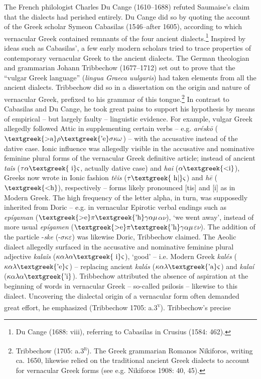 \documentclass[12pt]{article}
\newenvironment{styleStandard}{\renewcommand\baselinestretch{1.25}\setlength\leftskip{0in}\setlength\rightskip{0in}\setlength\parindent{0.1972in}\setlength\parfillskip{0pt plus 1fil}\setlength\parskip{0in plus 1pt}\writerlistparindent\writerlistleftskip\leavevmode\normalfont\normalsize\writerlistlabel\ignorespaces}{\unskip\vspace{0in plus 1pt}\par}
\newcommand\writerlistleftskip{}
\newcommand\writerlistparindent{}
\newcommand\writerlistlabel{}
\begin{document}
\begin{styleStandard}
The French philologist Charles Du Cange (1610–1688) refuted Saumaise’s claim that the dialects had perished entirely. Du Cange did so by quoting the account of the Greek scholar Symeon Cabasilas (1546–after 1605), according to which vernacular Greek contained remnants of the four ancient dialects.\footnote{ Du Cange (1688: viii), referring to Cabasilas in Crusius (1584: 462).} Inspired by ideas such as Cabasilas’, a few early modern scholars tried to trace properties of contemporary vernacular Greek to the ancient dialects. The German theologian and grammarian Johann Tribbechow (1677–1712) set out to prove that the “vulgar Greek language” (\textit{lingua Graeca uulgaris}) had taken elements from all the ancient dialects. Tribbechow did so in a dissertation on the origin and nature of vernacular Greek, prefixed to his grammar of this tongue.\footnote{ Tribbechow (1705: a.3\textsc{\textsuperscript{r}}). The Greek grammarian Romanos Nikiforos, writing ca. 1650, likewise relied on the traditional ancient Greek dialects to account for vernacular Greek forms (see e.g. Nikiforos 1908: 40, 45).} In contrast to Cabasilas and Du Cange, he took great pains to support his hypothesis by means of empirical – but largely faulty – linguistic evidence. For example, vulgar Greek allegedly followed Attic in supplementing certain verbs – e.g. \textit{arésk\=o }($\text{\textgreek{>a}}\rho \text{\textgreek{'e}}\sigma \kappa \omega $) – with the accusative instead of the dative case. Ionic influence was allegedly visible in the accusative and nominative feminine plural forms of the vernacular Greek definitive article; instead of ancient \textit{taîs} ($\tau \alpha \text{\textgreek{~i}}\varsigma $, actually dative case) and \textit{hai} ($\alpha \text{\textgreek{<i}}$), Greeks now wrote in Ionic fashion \textit{têis} ($\tau \text{\textgreek{~h|}}\varsigma $) and \textit{h\=e} ($\text{\textgreek{<h}}$), respectively – forms likely pronounced [tis] and [i] as in Modern Greek. The high frequency of the letter alpha, in turn, was supposedly inherited from Doric – e.g. in vernacular Epirotic verbal endings such as \textit{epígaman }($\text{\textgreek{>e}}\pi \text{\textgreek{'h}}\gamma \alpha \mu $$\alpha $$\nu $), ‘we went away’, instead of more usual \textit{epígamen} ($\text{\textgreek{>e}}\pi \text{\textgreek{'h}}\gamma \alpha \mu $$\varepsilon $$\nu $). The addition of the particle -\textit{ske} (-$\sigma \kappa \varepsilon $) was likewise Doric, Tribbechow claimed. The Aeolic dialect allegedly surfaced in the accusative and nominative feminine plural adjective \textit{kalaîs} ($\kappa \alpha \lambda \alpha \text{\textgreek{~i}}\varsigma $), ‘good’ – i.e. Modern Greek \textit{kalés }($\kappa \alpha \lambda \text{\textgreek{'e}}\varsigma $) – replacing ancient \textit{kalás} ($\kappa \alpha \lambda \text{\textgreek{'a}}\varsigma $) and \textit{kalaí} ($\kappa \alpha \lambda \alpha \text{\textgreek{'i}}$). Tribbechow attributed the absence of aspiration at the beginning of words in vernacular Greek – so-called psilosis – likewise to this dialect. Uncovering the dialectal origin of a vernacular form often demanded great effort, he emphasized (Tribbechow 1705: a.3\textsc{\textsuperscript{v}}). Tribbechow’s precise 
\end{styleStandard}
\end{document}
